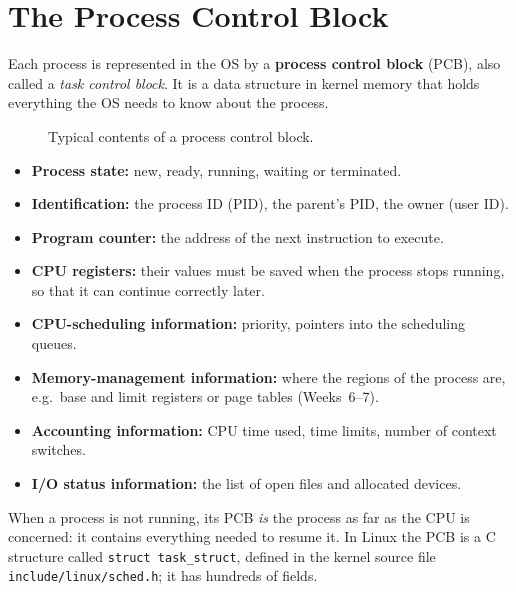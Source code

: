 \documentclass[11pt,a4paper]{article}
\newcommand{\term}[1]{\textbf{\color{mintdeep}#1}}
\begin{document}
\section{The Process Control Block}
\label{sec:pcb}

Each process is represented in the OS by a \term{process control block} (PCB), also called a \emph{task control block}. It is a data structure in kernel memory that holds everything the OS needs to know about the process.

\begin{figure}[H]
\centering
{}
\caption{Typical contents of a process control block.}
\end{figure}

\begin{itemize}
  \item \textbf{Process state:} new, ready, running, waiting or terminated.
  \item \textbf{Identification:} the process ID (PID), the parent's PID, the owner (user ID).
  \item \textbf{Program counter:} the address of the next instruction to execute.
  \item \textbf{CPU registers:} their values must be saved when the process stops running, so that it can continue correctly later.
  \item \textbf{CPU-scheduling information:} priority, pointers into the scheduling queues.
  \item \textbf{Memory-management information:} where the regions of the process are, e.g.\ base and limit registers or page tables (Weeks~6--7).
  \item \textbf{Accounting information:} CPU time used, time limits, number of context switches.
  \item \textbf{I/O status information:} the list of open files and allocated devices.
\end{itemize}

When a process is not running, its PCB \emph{is} the process as far as the CPU is concerned: it contains everything needed to resume it. In Linux the PCB is a C structure called \texttt{struct task\_struct}, defined in the kernel source file \texttt{include/linux/sched.h}; it has hundreds of fields.
\end{document}
